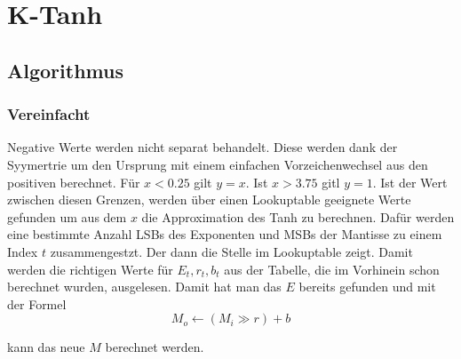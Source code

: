 %
%
%
\section{K-Tanh
\label{transfer:section:teil3}}


\subsection{Algorithmus
\label{transfer:subsection:Ktanh-Algorithmus}}
\cite{transfer:DBLP:journals/corr/abs-1909-07729}
\subsubsection{Vereinfacht
\label{transfer:subsection:Ktanh-Algorithmus:Vereinfacht}}
Negative Werte werden nicht separat behandelt. Diese werden dank der Syymertrie um den Ursprung mit einem einfachen Vorzeichenwechsel aus den positiven berechnet.
Für $x < 0.25$ gilt $y = x$.
Ist $x > 3.75$ gitl $y = 1$.
Ist der Wert zwischen diesen Grenzen, werden über einen Lookuptable geeignete Werte gefunden um aus dem $x$ die Approximation des Tanh zu berechnen.
Dafür werden eine bestimmte Anzahl LSBs des Exponenten und MSBs der Mantisse zu einem Index $t$ zusammengestzt. Der dann die Stelle im Lookuptable zeigt.
Damit werden die richtigen Werte für $E_{t}, r_{t}, b_{t}$ aus der Tabelle, die im Vorhinein schon berechnet wurden, ausgelesen.
Damit hat man das $E$ bereits gefunden und mit der Formel
\[
    M_{o} \leftarrow\left(M_{i} \gg r\right)+b
\]

kann das neue $M$ berechnet werden.
